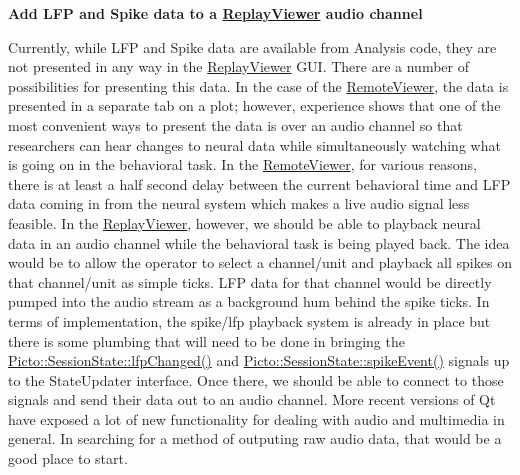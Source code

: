 {\bfseries Add L\-F\-P and Spike data to a \hyperlink{class_replay_viewer}{Replay\-Viewer} audio channel}\par
 Currently, while L\-F\-P and Spike data are available from Analysis code, they are not presented in any way in the \hyperlink{class_replay_viewer}{Replay\-Viewer} G\-U\-I. There are a number of possibilities for presenting this data. In the case of the \hyperlink{class_remote_viewer}{Remote\-Viewer}, the data is presented in a separate tab on a plot; however, experience shows that one of the most convenient ways to present the data is over an audio channel so that researchers can hear changes to neural data while simultaneously watching what is going on in the behavioral task. In the \hyperlink{class_remote_viewer}{Remote\-Viewer}, for various reasons, there is at least a half second delay between the current behavioral time and L\-F\-P data coming in from the neural system which makes a live audio signal less feasible. In the \hyperlink{class_replay_viewer}{Replay\-Viewer}, however, we should be able to playback neural data in an audio channel while the behavioral task is being played back. The idea would be to allow the operator to select a channel/unit and playback all spikes on that channel/unit as simple ticks. L\-F\-P data for that channel would be directly pumped into the audio stream as a background hum behind the spike ticks. In terms of implementation, the spike/lfp playback system is already in place but there is some plumbing that will need to be done in bringing the \hyperlink{class_picto_1_1_session_state_a5ab201c9c6bbe8e09774987465bcc2df}{Picto\-::\-Session\-State\-::lfp\-Changed()} and \hyperlink{class_picto_1_1_session_state_a41d2edbdbc1239351e37402c8c5d41d0}{Picto\-::\-Session\-State\-::spike\-Event()} signals up to the State\-Updater interface. Once there, we should be able to connect to those signals and send their data out to an audio channel. More recent versions of Qt have exposed a lot of new functionality for dealing with audio and multimedia in general. In searching for a method of outputing raw audio data, that would be a good place to start.

